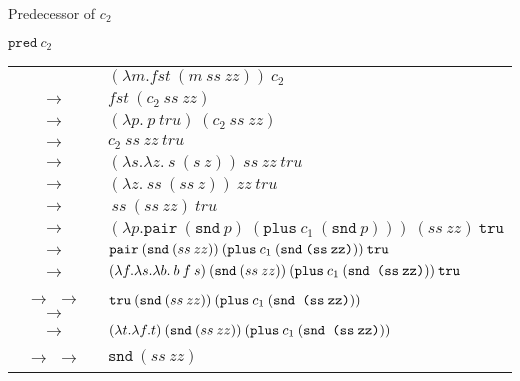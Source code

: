 \documentclass[11pt]{beamer}
\begin{document}
\begin{frame}[fragile=singleslide]{Predecessor of $c_2$}
\begin{center}
\underline{$\texttt{pred}\:c_2$} \\
\begin{tabular}{c l}
& $(\lambda m. fst\:(m\:ss\:zz))\:c_2$ \\ 
$\rightarrow$ & $fst\:(c_2\:ss\:zz)$ \\ 
$\rightarrow$ & $(\lambda p.\:p\:tru)\:(c_2\:ss\:zz)$ \\ 
$\rightarrow$ & $c_2\:ss\:zz\:tru$ \\ 
$\rightarrow$ & $(\lambda s. \lambda z.\:s\:(s\:z))\:ss\:zz\:tru$ \\ 
$\rightarrow$ & $(\lambda z.\:ss\:(ss\:z))\:zz\:tru$ \\ 
$\rightarrow$ & $\:ss\:(ss\:zz)\:tru$ \\ 
$\rightarrow$ & $(\lambda p. \texttt{pair}\:(\texttt{snd}\:p)\:(\texttt{plus}\:c_1\:(\texttt{snd}\:p)))\:(ss\:zz)\:\texttt{tru}$ \\
$\rightarrow$ & $\texttt{pair}\:(\texttt{snd}\:(ss\:zz))\:(\texttt{plus}\:c_1\:(\texttt{snd\:(ss\:zz)}))\:\texttt{tru}$ \\
$\rightarrow$ & $(\lambda f. \lambda s. \lambda b.\:b\:f\:s)\:(\texttt{snd}\:(ss\:zz))\:(\texttt{plus}\:c_1\:(\texttt{snd (ss\:zz)}))\:\texttt{tru}$ \\
$\rightarrow$ $\rightarrow$ $\rightarrow$ & $\texttt{tru}\:(\texttt{snd}\:(ss\:zz))\:(\texttt{plus}\:c_1\:(\texttt{snd (ss\:zz)}))$ \\
$\rightarrow$ & $(\lambda t.\lambda f. t)\:(\texttt{snd}\:(ss\:zz))\:(\texttt{plus}\:c_1\:(\texttt{snd (ss\:zz)}))$ \\
$\rightarrow$ $\rightarrow$ & $\texttt{snd}\:(ss\:zz)$ \\


\end{tabular}
\end{center}
\end{frame}
\end{document}
